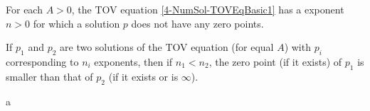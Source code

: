 \begin{theorem}
	For each $A>0$, the TOV equation \ref{4-NumSol-TOVEqBasic1} has a exponent $n>0$ for which a solution $p$ does not have any zero points.
\end{theorem}
\begin{theorem}
	If $p_1$ and $p_2$ are two solutions of the TOV equation (for equal $A$) with $p_i$ corresponding to $n_i$ exponents, then if $n_1<n_2$, the zero 
	point (if it exists) of $p_1$ is smaller than that of $p_2$ (if it exists or is $\infty$).
\end{theorem}
\begin{theorem}
	a 
\end{theorem}




